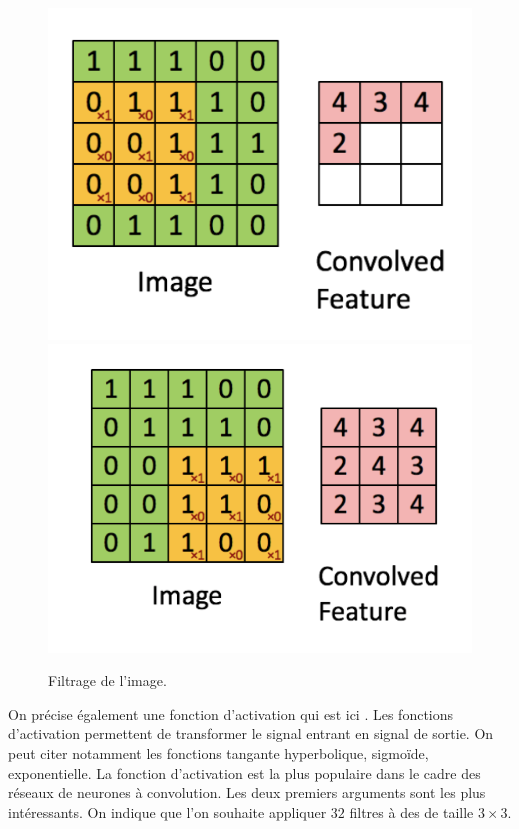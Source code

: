 \begin{figure}[h]
  \centering
  \includegraphics[scale=0.6]{assets/filtrage}
  \includegraphics[scale=0.6]{assets/image-filtree}
  \caption{Filtrage de l'image.}
  \label{fig:filtrage}
\end{figure}


On précise également une fonction d'activation qui est ici .
Les fonctions d'activation permettent de transformer le signal 
entrant en signal de sortie. On peut citer notamment les 
fonctions tangante hyperbolique, sigmoïde, exponentielle. La fonction d'activation 
 est la plus populaire dans le cadre des réseaux de neurones à convolution.
Les deux premiers arguments sont les plus intéressants. 
On indique que l'on souhaite appliquer $32$ filtres à des  de taille 
$3 \times 3$. 

